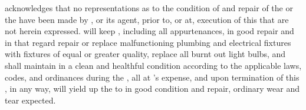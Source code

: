\lessee acknowledges that no representations as to the condition of and repair of the \building or the \premises have been made by \lessor, or its agent, prior to, or at, execution of this \lease that are not herein expressed. \lessee will keep \premises, including all appurtenances, in good repair and in that regard repair or replace malfunctioning plumbing and electrical fixtures with fixtures of equal or greater quality, replace all burnt out light bulbs, and shall maintain \premises in a clean and healthful condition according to the applicable laws, codes, and ordinances during the \termOfLease, all at \lessee's expense, and upon termination of this \lease, in any way, \lessee will yield up the \premises to \lessor in good condition and repair, ordinary wear and tear expected.
